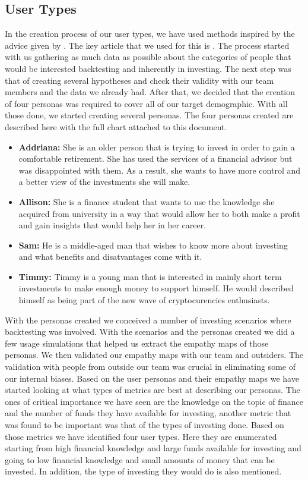 \documentclass[main.tex]{subfiles}
\begin{document}
\subsection{User Types}
In the creation process of our user types, we have used methods inspired by the advice given by \cite{uiux_fundation}. The key article that we used for this is \cite{user_types_interaction_design_fundation}. The process started with us gathering as much data as possible about the categories of people that would be interested backtesting and inherently in investing. The next step was that of creating several hypotheses and check their validity with our team members and the data we already had. After that, we decided that the creation of four personas was required to cover all of our target demographic. With all those done, we started creating several personas. 
The four personas created are described here with the full chart attached to this document.
\begin{itemize}
\item \textbf{Addriana: }She is an older person that is trying to invest in order to gain a comfortable retirement. She has used the services of a financial advisor but was disappointed with them. As a result, she wants to have more control and a better view of the investments she will make.
\item \textbf{Allison: }She is a finance student that wants to use the knowledge she acquired from university in a way that would allow her to both make a profit and gain insights that would help her in her career.
\item\textbf{Sam: }He is a middle-aged man that wishes to know more about investing and what benefits and disatvantages come with it. 
\item\textbf{Timmy: }Timmy is a young man that is interested in mainly short term investments to make enough money to support himself. He would described himself as being part of the new wave of cryptocurencies enthusiasts.
\end{itemize}

With the personas created we conceived a number of  investing scenarios where backtesting was involved. With the scenarios and the personas created we did a few usage simulations that helped us extract the empathy maps of those personas. We then validated our empathy maps with our team and outsiders. The validation with people from outside our team was crucial in eliminating some of our internal biases.
Based on the user personas and their empathy maps we have started looking at what types of metrics are best at describing our personas. The ones of critical importance we have seen are the knowledge on the topic of finance and the number of funds they have available for investing, another metric that was found to be important was that of the types of investing done. Based on those metrics we have identified four user types. Here they are enumerated starting from high financial knowledge and large funds available for investing and going to low financial knowledge and small amounts of money that can be invested. In addition, the type of investing they would do is also mentioned.
\end{document}
